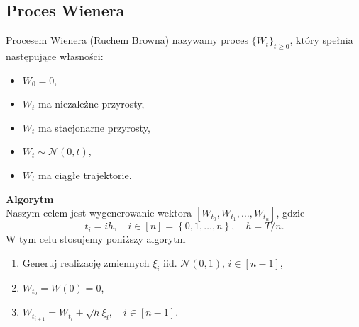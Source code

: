 \documentclass[12pt]{mwart}
\begin{document}
	\subsection{Proces Wienera}
	\noindent Procesem Wienera (Ruchem Browna) nazywamy proces $\{W_t\}_{t\geqslant0}$, który spełnia następujące własności:
	\begin{itemize}[leftmargin=10mm, label=\small$\bullet$]%
		\item $W_0=0$,
		\item $W_t$ ma niezależne przyrosty,
		\item $W_t$ ma stacjonarne przyrosty,
		\item $W_t \sim \mathcal{N}(0, t)$,
		\item $W_t$ ma ciągłe trajektorie.
	\end{itemize}	
	\noindent \textbf{Algorytm}\\
	\noindent Naszym celem jest wygenerowanie wektora $\left[W_{t_0}, W_{t_1}, \dots, W_{t_n}\right]$, gdzie
	\begin{equation*}
		t_i=ih, \quad i\in\left[n\right]=\left\{0, 1, \dots, n\right\}, \quad h=T/n.
	\end{equation*}
	W tym celu stosujemy poniższy algorytm
	\begin{enumerate}[leftmargin=10mm]
		\item Generuj realizację zmiennych $\xi_i\text{ iid. }\mathcal{N}(0,1), \,i\in\left[n-1\right]$,
		\item $W_{t_0}=W\left(0\right)=0$,
		\item $W_{t_{i+1}} = W_{t_{i}}+\sqrt{h}\xi_i,\quad i\in\left[n-1\right].$%
	\end{enumerate}
\end{document}
